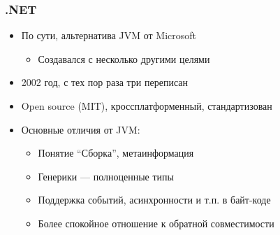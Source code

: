 \documentclass[xetex,mathserif,serif]{beamer}
\begin{document}
    \begin{frame}
        \frametitle{.NET}
        \begin{itemize}
            \item По сути, альтернатива JVM от Microsoft
            \begin{itemize}
                \item Создавался с несколько другими целями
            \end{itemize}
            \item 2002 год, с тех пор раза три переписан
            \item Open source (MIT), кроссплатформенный, стандартизован
            \item Основные отличия от JVM:
            \begin{itemize}
                \item Понятие ``Сборка'', метаинформация
                \item Генерики --- полноценные типы
                \item Поддержка событий, асинхронности и т.п. в байт-коде
                \item Более спокойное отношение к обратной совместимости
            \end{itemize}
        \end{itemize}
    \end{frame}
\end{document}
